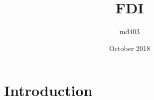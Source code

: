 \documentclass{article}
\title{FDI}
\author{md403}
\date{October 2018}
\begin{document}
\maketitle

\section{Introduction}
\end{document}
